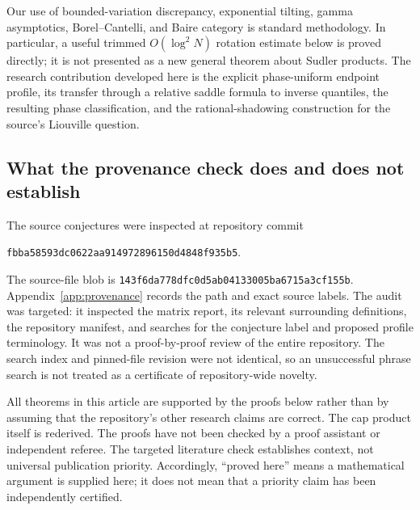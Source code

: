 \documentclass[11pt,a4paper]{article}
\theoremstyle{definition}
\theoremstyle{remark}\newtheorem{remark}[theorem]{Remark}
\newcommand{\pinned}{\texttt{fbba58593dc0622aa914972896150d4848f935b5}}
\begin{document}
Our use of bounded-variation discrepancy, exponential tilting, gamma
asymptotics, Borel--Cantelli, and Baire category is standard methodology.
In particular, a useful trimmed $O(\log^2 N)$ rotation estimate below is
proved directly; it is not presented as a new general theorem about Sudler
products.  The research contribution developed here is the explicit
phase-uniform endpoint profile, its transfer through a relative saddle
formula to inverse quantiles, the resulting phase classification, and the
rational-shadowing construction for the source's Liouville question.

\subsection{What the provenance check does and does not establish}

The source conjectures were inspected at repository commit
\begin{center}\small\pinned.\end{center}
The source-file blob is
\texttt{143f6da778dfc0d5ab04133005ba6715a3cf155b}.
Appendix~\ref{app:provenance} records the path and exact source labels.
The audit was targeted: it inspected the matrix report, its relevant
surrounding definitions, the repository manifest, and searches for the
conjecture label and proposed profile terminology.  It was not a proof-by-proof
review of the entire repository.  The search index and pinned-file revision
were not identical, so an unsuccessful phrase search is not treated as a
certificate of repository-wide novelty.

All theorems in this article are supported by the proofs below rather than by
assuming that the repository's other research claims are correct.  The cap
product itself is rederived.  The proofs have not been checked by a proof
assistant or independent referee.  The targeted literature check establishes
context, not universal publication priority.  Accordingly, ``proved here''
means a mathematical argument is supplied here; it does not mean that a
priority claim has been independently certified.
\end{document}

